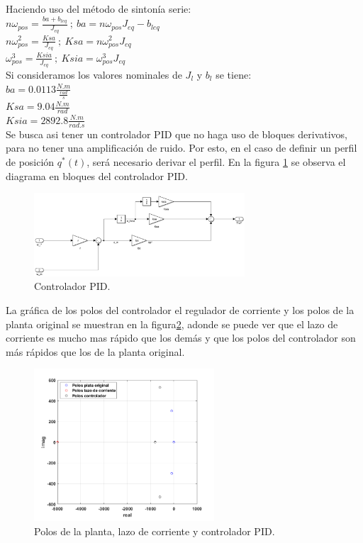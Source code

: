 \documentclass[10pt]{article}
\begin{document}
	Haciendo uso del método de sintonía serie:\\
	$ n\omega_{pos}=\frac{ba+b_{leq}}{J_{eq}} \ ; \ ba=n\omega_{pos}J_{eq}-b_{leq}$ \\
	$ n\omega^{2}_{pos}=\frac{Ksa}{J_{eq}} \ ; \  Ksa=n\omega^{2}_{pos}J_{eq} $\\
	$ \omega^{3}_{pos}=\frac{Ksia}{J_{eq}} \ ; \  Ksia=\omega^{3}_{pos}J_{eq} $\\
	
	Si consideramos los valores nominales de $J_{l}$ y $b_{l}$ se tiene:\\
	$ba=0.0113 \frac{N.m}{\frac{rad}{s}}$\\
	$Ksa=9.04 \frac{N.m}{rad}$\\
	$Ksia=2892.8 \frac{N.m}{rad.s}$\\
	
	Se busca asi tener un controlador PID que no haga uso de bloques derivativos, para no tener una amplificación de ruido. Por esto, en el caso de definir un perfil de posición $q^{*}(t)$, será necesario derivar el perfil.
	En la figura \ref{fig:controladorPID} se observa el diagrama en bloques del controlador PID.
		 	\begin{figure}[h!]
	\centering
	\includegraphics[width=0.7\textwidth]{controladorPID.png}
	\caption{\label{fig:controladorPID}Controlador PID.}
	\end{figure}
	
	La gráfica de los polos del controlador el regulador de corriente y los polos de la planta original se muestran en la figura\ref{fig:Polosmodelos}, adonde se puede ver que el lazo de corriente es mucho mas rápido que los demás y que los polos del controlador son más rápidos que los de la planta original.
			 	\begin{figure}[h!]
	\centering
	\includegraphics[width=0.6\textwidth]{Polosmodelos.png}
	\caption{\label{fig:Polosmodelos}Polos de la planta, lazo de corriente y controlador PID.}
	\end{figure}
	
\end{document}
